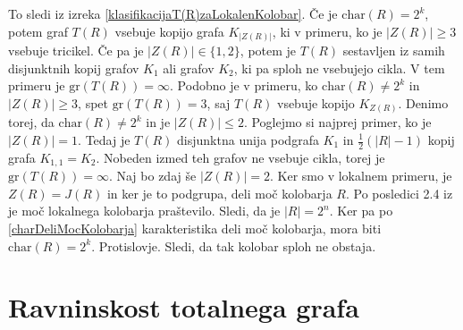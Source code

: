 \documentclass[a4paper, 12pt]{amsart}
\theoremstyle{definition} %
\theoremstyle{plain} %
\begin{document}
\proof
To sledi iz izreka \ref{klasifikacijaT(R)zaLokalenKolobar}. Če je $\textrm{char}(R) = 2^k$, potem graf $T(R)$ vsebuje kopijo grafa $K_{|Z(R)|}$, ki v primeru, ko je $|Z(R)| \ge 3$ vsebuje tricikel. Če pa je $|Z(R)| \in \{1,2\}$, potem je $T(R)$ sestavljen iz samih disjunktnih kopij grafov $K_1$ ali grafov $K_2$, ki pa sploh ne vsebujejo cikla. V tem primeru je $\textrm{gr}(T(R)) = \infty$. Podobno je v primeru, ko $\textrm{char}(R) \neq 2^k$ in $|Z(R)| \ge 3$, spet $\textrm{gr}(T(R)) = 3$, saj $T(R)$ vsebuje kopijo $K_{Z(R)}$. Denimo torej, da $\textrm{char}(R) \neq 2^k$ in je $|Z(R)| \le 2$. Poglejmo si najprej primer, ko je $|Z(R)| = 1$. Tedaj je $T(R)$ disjunktna unija podgrafa $K_1$ in $\frac{1}{2}(|R| - 1)$ kopij grafa $K_{1,1} = K_2$. Nobeden izmed teh grafov ne vsebuje cikla, torej je $\textrm{gr} (T(R)) = \infty$. Naj bo zdaj še $|Z(R)| = 2$. Ker smo v lokalnem primeru, je $Z(R) = J(R)$ in ker je to podgrupa, deli moč kolobarja $R$. Po posledici 2.4 iz \cite{diploma} je moč lokalnega kolobarja praštevilo. Sledi, da je $|R| = 2^n$. Ker pa po \ref{charDeliMocKolobarja} karakteristika deli moč kolobarja, mora biti $\textrm{char}(R) = 2^k$. Protislovje. Sledi, da tak kolobar sploh ne obstaja.
\endproof

\section{Ravninskost totalnega grafa}
\end{document}
